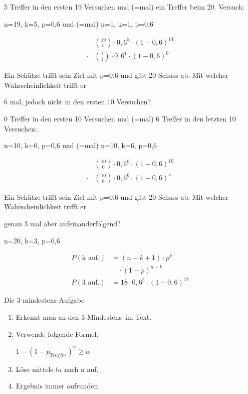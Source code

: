 \begin{antwort}5 Treffer in den ersten 19 Versuchen und (=mal) ein Treffer beim 20. Versuch:
	
	n=19, k=5, p=0,6 und (=mal) n=1, k=1, p=0,6
	
	\bigskip
	\begin{align*}
	&\binom{19}{5} \cdot 0,6^{5} \cdot (1-0,6)^{14} \\
	\cdot &\binom{1}{1} \cdot 0,6^{1} \cdot (1-0,6)^{0}
	\end{align*}\end{antwort}
\begin{frage}\large
	Ein Schütze trifft sein Ziel mit p=0,6 und gibt 20 Schuss ab. Mit welcher Wahrscheinlichkeit trifft er  
	
	\LARGE 
	6 mal, jedoch nicht in den ersten 10 Versuchen?\end{frage}
\begin{antwort}0 Treffer in den ersten 10 Versuchen und (=mal) 6 Treffer in den letzten 10 Versuchen:
	
	n=10, k=0, p=0,6 und (=mal) n=10, k=6, p=0,6
	
	\bigskip
	\begin{align*}
	&\binom{10}{0} \cdot 0,6^{0} \cdot (1-0,6)^{10} \\
	\cdot &\binom{10}{6} \cdot 0,6^{6} \cdot (1-0,6)^{4}
	\end{align*}\end{antwort}
\begin{frage}\large
	Ein Schütze trifft sein Ziel mit p=0,6 und gibt 20 Schuss ab. Mit welcher Wahrscheinlichkeit trifft er 
	
	\LARGE 
	genau 3 mal aber aufeinanderfolgend?\end{frage}
\begin{antwort}n=20, k=3, p=0,6
	
	\bigskip
	\begin{align*}
	P(\text{k auf.})&=(n-k+1)\cdot p^{k}\\
	&\quad\cdot (1-p)^{n-k} \\
	P(\text{3 auf.})&=18\cdot 0,6^{3} \cdot (1-0,6)^{17}
	\end{align*}\end{antwort}
\begin{frage}Die 3-mindestens-Aufgabe\end{frage}
\begin{antwort}\begin{enumerate}
		\item Erkennt man an den 3 \glqq Mindestens\grqq~im Text. 
		\item Verwende folgende Formel:
		
		 $1-(1-p_{Treffer})^n\geq \alpha$
		\item Löse mittels $ln$ nach  n auf.
		\item Ergebnis immer aufrunden.
	\end{enumerate}\end{antwort}

